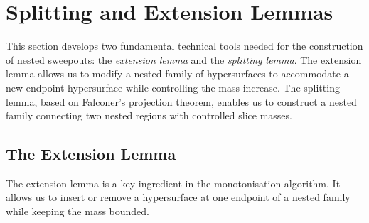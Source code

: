 \section{Splitting and Extension Lemmas}\label{ch:splitting-and-extension}
This section develops two fundamental technical tools needed for the construction of nested sweepouts: the \emph{extension lemma} and the \emph{splitting lemma}. The extension lemma allows us to modify a nested family of hypersurfaces to accommodate a new endpoint hypersurface while controlling the mass increase. The splitting lemma, based on Falconer's projection theorem, enables us to construct a nested family connecting two nested regions with controlled slice masses.

\subsection{The Extension Lemma}\label{sec:extension-lemma}
The extension lemma is a key ingredient in the monotonisation algorithm. It allows us to insert or remove a hypersurface at one endpoint of a nested family while keeping the mass bounded.

